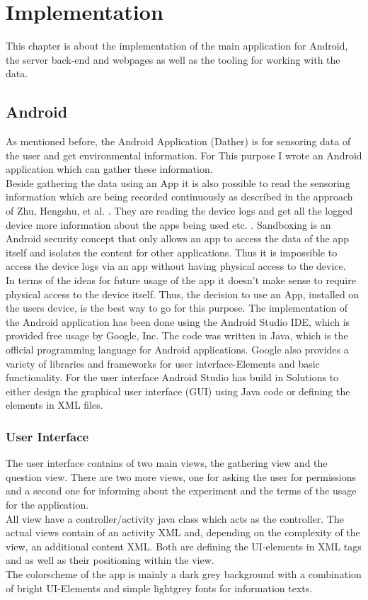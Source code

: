 \chapter{Implementation}

This chapter is about the implementation of the main application for Android, the server back-end and webpages as well as the tooling for working with the data. 

\section{Android}
As mentioned before, the Android Application (Dather) is for sensoring data of the user and get environmental information. For This purpose I wrote an Android application which can gather these information.\\ 
Beside gathering the data using an App it is also possible to read the sensoring information which are being recorded continuously as described in the approach of
Zhu, Hengshu, et al. \cite{zhu2015mining}. They are reading the device logs and get all the logged device more information about the apps being used etc. .
Sandboxing is an Android security concept that only allows an app to access the data of the app itself and isolates the content for other applications. Thus it is impossible to access the device logs via an app without having physical access to the device. \\
In terms of the ideas for future usage of the app it doesn't make sense to require physical access to the device itself. Thus, the decision to use an App, installed on the users device, is the best way to go for this purpose.
\bigbreak
The implementation of the Android application has been done using the Android Studio IDE, which is provided free usage by Google, Inc. The code was written in Java, which is the official programming language for Android applications. Google also provides a variety of libraries and frameworks for user interface-Elements and basic functionality. For the user interface Android Studio has build in Solutions to either design the graphical user interface (GUI) using Java code or defining the elements in XML files. 

\subsection{User Interface}
The user interface contains of two main views, the gathering view and the question view. There are two more views, one for asking the user for permissions and a second one for informing about the experiment and the terms of the usage for the application. \\
All view have a controller/activity java class which acts as the controller. The actual views contain of an activity XML and, depending on the complexity of the view, an additional content XML. Both are defining the UI-elements in XML tags and as well as their positioning within the view. \\
The colorscheme of the app is mainly a dark grey background with a combination of bright UI-Elements and simple lightgrey fonts for information texts.

